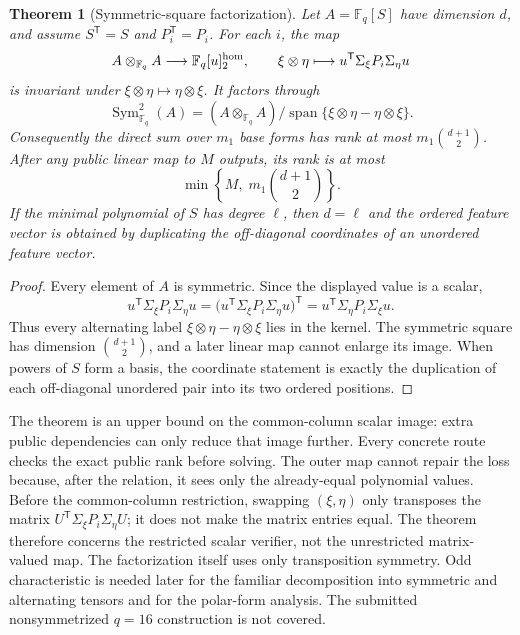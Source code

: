 \documentclass[11pt]{article}
\newtheorem{theorem}{Theorem}[section]
\newcommand{\F}{\mathbb F}
\newcommand{\Sym}{\operatorname{Sym}}
\newcommand{\Span}{\operatorname{span}}
\newcommand{\transpose}{\mathsf T}
\begin{document}
\begin{theorem}[Symmetric-square factorization]\label{thm:symmetry-quotient}
Let $A=\F_q[S]$ have dimension $d$, and assume $S^\transpose=S$ and
$P_i^\transpose=P_i$.  For each $i$, the map
\[
  A\otimes_{\F_q}A\longrightarrow \F_q[u]^{\rm hom}_2,
  \qquad
  \xi\otimes\eta\longmapsto u^\transpose\Sigma_\xi P_i\Sigma_\eta u
\]
is invariant under $\xi\otimes\eta\mapsto\eta\otimes\xi$.  It factors
through
\[
  \Sym^2_{\F_q}(A)=
  (A\otimes_{\F_q}A)/\Span\{\xi\otimes\eta-\eta\otimes\xi\}.
\]
Consequently the direct sum over $m_1$ base forms has rank at most
$m_1\binom{d+1}{2}$.  After any public linear map to $M$ outputs, its rank is
at most
\begin{equation}
  \min\left\{M,\;m_1\binom{d+1}{2}\right\}.          \label{eq:symmetry-cap}
\end{equation}
If the minimal polynomial of $S$ has degree $\ell$, then $d=\ell$ and the
ordered feature vector is obtained by duplicating the off-diagonal
coordinates of an unordered feature vector.
\end{theorem}

\begin{proof}
Every element of $A$ is symmetric.  Since the displayed value is a scalar,
\[
 u^\transpose\Sigma_\xi P_i\Sigma_\eta u
 =\bigl(u^\transpose\Sigma_\xi P_i\Sigma_\eta u\bigr)^\transpose
 =u^\transpose\Sigma_\eta P_i\Sigma_\xi u.
\]
Thus every alternating label $\xi\otimes\eta-\eta\otimes\xi$ lies in the
kernel.  The symmetric square has dimension $\binom{d+1}{2}$, and a later
linear map cannot enlarge its image.  When powers of $S$ form a basis, the
coordinate statement is exactly the duplication of each off-diagonal
unordered pair into its two ordered positions.
\end{proof}

The theorem is an upper bound on the common-column scalar image: extra public
dependencies can only reduce that image further.  Every concrete route checks
the exact public rank before solving.  The outer map cannot repair the loss
because, after the relation, it sees only the already-equal polynomial values.
Before the common-column restriction, swapping $(\xi,\eta)$ only transposes
the matrix $U^\transpose\Sigma_\xi P_i\Sigma_\eta U$; it does not make the
matrix entries equal.  The theorem therefore concerns the restricted scalar
verifier, not the unrestricted matrix-valued map.
The factorization itself uses only transposition symmetry.  Odd
characteristic is needed later for the familiar decomposition into symmetric
and alternating tensors and for the polar-form analysis.  The submitted
nonsymmetrized $q=16$ construction is not covered.
\end{document}
